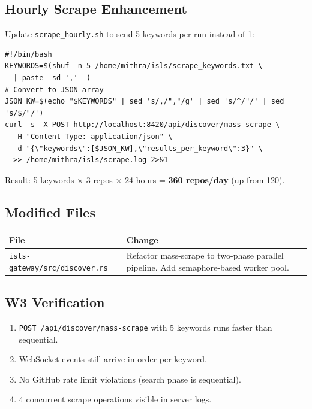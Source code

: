 \documentclass[11pt,a4paper]{article}
\begin{document}
\subsection{Hourly Scrape Enhancement}

Update \texttt{scrape\_hourly.sh} to send 5 keywords per run 
instead of 1:

\begin{lstlisting}[style=bash]
#!/bin/bash
KEYWORDS=$(shuf -n 5 /home/mithra/isls/scrape_keywords.txt \
  | paste -sd ',' -)
# Convert to JSON array
JSON_KW=$(echo "$KEYWORDS" | sed 's/,/","/g' | sed 's/^/"/' | sed 's/$/"/')
curl -s -X POST http://localhost:8420/api/discover/mass-scrape \
  -H "Content-Type: application/json" \
  -d "{\"keywords\":[$JSON_KW],\"results_per_keyword\":3}" \
  >> /home/mithra/isls/scrape.log 2>&1
\end{lstlisting}

Result: 5 keywords $\times$ 3 repos $\times$ 24 hours = 
\textbf{360 repos/day} (up from 120).

\subsection{Modified Files}

\begin{longtable}{lp{10cm}}
\toprule
\textbf{File} & \textbf{Change} \\
\midrule
\texttt{isls-gateway/src/discover.rs}
  & Refactor mass-scrape to two-phase parallel pipeline. 
    Add semaphore-based worker pool. \\
\bottomrule
\end{longtable}

\subsection{W3 Verification}

\begin{enumerate}[nosep]
\item \texttt{POST /api/discover/mass-scrape} with 5 keywords 
      runs faster than sequential.
\item WebSocket events still arrive in order per keyword.
\item No GitHub rate limit violations (search phase is sequential).
\item 4 concurrent scrape operations visible in server logs.
\end{enumerate}


\end{document}
